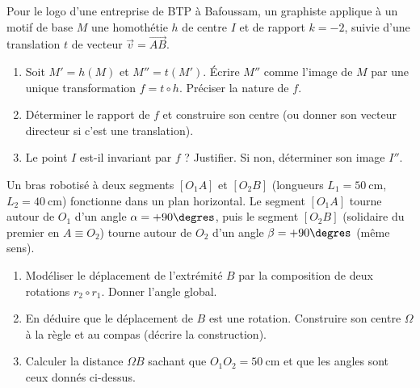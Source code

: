 \documentclass[11pt]{article}
\begin{document}
\begin{exercice}
Pour le logo d'une entreprise de BTP à Bafoussam, un graphiste applique à un motif de base $M$ une homothétie $h$ de centre $I$ et de rapport $k = -2$, suivie d'une translation $t$ de vecteur $\vec{v} = \overrightarrow{AB}$.
\begin{enumerate}
    \item Soit $M' = h(M)$ et $M'' = t(M')$. Écrire $M''$ comme l'image de $M$ par une unique transformation $f = t \circ h$. Préciser la nature de $f$.
    \item Déterminer le rapport de $f$ et construire son centre (ou donner son vecteur directeur si c'est une translation).
    \item Le point $I$ est-il invariant par $f$ ? Justifier. Si non, déterminer son image $I''$.
\end{enumerate}
\end{exercice}

\begin{exercice}
Un bras robotisé à deux segments $[O_1A]$ et $[O_2B]$ (longueurs $L_1 = \SI{50}{\centi\meter}$, $L_2 = \SI{40}{\centi\meter}$) fonctionne dans un plan horizontal. Le segment $[O_1A]$ tourne autour de $O_1$ d'un angle $\alpha = +90\degres$, puis le segment $[O_2B]$ (solidaire du premier en $A \equiv O_2$) tourne autour de $O_2$ d'un angle $\beta = +90\degres$ (même sens).
\begin{enumerate}
    \item Modéliser le déplacement de l'extrémité $B$ par la composition de deux rotations $r_2 \circ r_1$. Donner l'angle global.
    \item En déduire que le déplacement de $B$ est une rotation. Construire son centre $\Omega$ à la règle et au compas (décrire la construction).
    \item Calculer la distance $\Omega B$ sachant que $O_1O_2 = \SI{50}{\centi\meter}$ et que les angles sont ceux donnés ci-dessus.
\end{enumerate}
\end{exercice}
\end{document}
